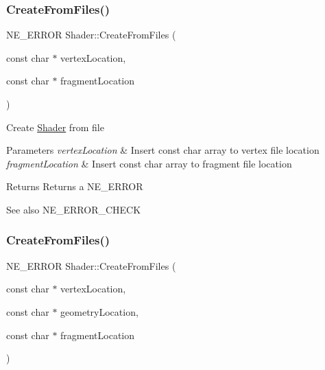 \subsubsection{\texorpdfstring{CreateFromFiles()}{CreateFromFiles()}\hspace{0.1cm}{\footnotesize\ttfamily [1/2]}}
{\footnotesize\ttfamily N\+E\+\_\+\+E\+R\+R\+OR Shader\+::\+Create\+From\+Files (\begin{DoxyParamCaption}\item[{const char $\ast$}]{vertex\+Location,  }\item[{const char $\ast$}]{fragment\+Location }\end{DoxyParamCaption})}

Create \mbox{\hyperlink{class_shader}{Shader}} from file 
\begin{DoxyParams}{Parameters}
{\em vertex\+Location} & Insert const char array to vertex file location \\
\hline
{\em fragment\+Location} & Insert const char array to fragment file location \\
\hline
\end{DoxyParams}
\begin{DoxyReturn}{Returns}
Returns a N\+E\+\_\+\+E\+R\+R\+OR 
\end{DoxyReturn}
\begin{DoxySeeAlso}{See also}
N\+E\+\_\+\+E\+R\+R\+O\+R\+\_\+\+C\+H\+E\+CK 
\end{DoxySeeAlso}
\mbox{\label{class_shader_a8acc385e9b2afc97833343472d237d10}} 
\subsubsection{\texorpdfstring{CreateFromFiles()}{CreateFromFiles()}\hspace{0.1cm}{\footnotesize\ttfamily [2/2]}}
{\footnotesize\ttfamily N\+E\+\_\+\+E\+R\+R\+OR Shader\+::\+Create\+From\+Files (\begin{DoxyParamCaption}\item[{const char $\ast$}]{vertex\+Location,  }\item[{const char $\ast$}]{geometry\+Location,  }\item[{const char $\ast$}]{fragment\+Location }\end{DoxyParamCaption})}

